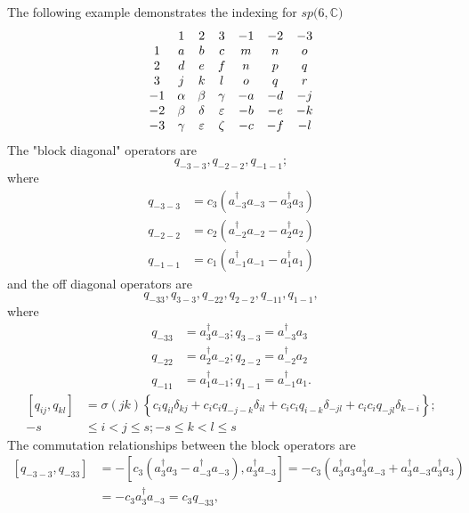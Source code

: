\documentclass[aps,preprint]{revtex4}%
\begin{document}
The following example demonstrates the indexing for $sp(6,\mathbb{C)}$%
\begin{equation}%
\begin{array}
[c]{ccccccc}
& 1 & 2 & 3 & -1 & -2 & -3\\
1 & a & b & c & m & n & o\\
2 & d & e & f & n & p & q\\
3 & j & k & l & o & q & r\\
-1 & \alpha & \beta & \gamma & -a & -d & -j\\
-2 & \beta & \delta & \varepsilon & -b & -e & -k\\
-3 & \gamma & \varepsilon & \zeta & -c & -f & -l
\end{array}
\end{equation}
The "block diagonal" operators are
\begin{equation}
q_{-3-3},q_{-2-2},q_{-1-1};
\end{equation}
where
\begin{align}
q_{-3-3}  &  =c_{3}\left(  a_{-3}^{\dagger}a_{-3}-a_{3}^{\dagger}a_{3}\right)
\nonumber\\
q_{-2-2}  &  =c_{2}\left(  a_{-2}^{\dagger}a_{-2}-a_{2}^{\dagger}a_{2}\right)
\nonumber\\
q_{-1-1}  &  =c_{1}\left(  a_{-1}^{\dagger}a_{-1}-a_{1}^{\dagger}a_{1}\right)
\end{align}
and the off diagonal operators are
\begin{equation}
q_{-33},q_{3-3},q_{-22},q_{2-2},q_{-11},q_{1-1},
\end{equation}
where%
\begin{align}
q_{-33}  &  =a_{3}^{\dagger}a_{-3};q_{3-3}=a_{-3}^{\dagger}a_{3}\nonumber\\
q_{-22}  &  =a_{2}^{\dagger}a_{-2};q_{2-2}=a_{-2}^{\dagger}a_{2}\nonumber\\
q_{-11}  &  =a_{1}^{\dagger}a_{-1};q_{1-1}=a_{-1}^{\dagger}a_{1}.
\end{align}%
\begin{align}
\left[  q_{ij},q_{kl}\right]   &  =\sigma\left(  jk\right)  \left\{
c_{i}q_{il}\delta_{kj}+c_{i}c_{i}q_{-j-k}\delta_{il}+c_{i}c_{i}q_{i-k}%
\delta_{-jl}+c_{i}c_{i}q_{-jl}\delta_{k-i}\right\}  ;\\
-s  &  \leq i<j\leq s;-s\leq k<l\leq s
\end{align}
The commutation relationships between the block operators are
\begin{align}
\left[  q_{-3-3},q_{-33}\right]   &  =-\left[  c_{3}\left(  a_{3}^{\dagger
}a_{3}-a_{-3}^{\dagger}a_{-3}\right)  ,a_{3}^{\dagger}a_{-3}\right]
=-c_{3}\left(  a_{3}^{\dagger}a_{3}a_{3}^{\dagger}a_{-3}+a_{3}^{\dagger}%
a_{-3}a_{3}^{\dagger}a_{3}\right) \nonumber\\
&  =-c_{3}a_{3}^{\dagger}a_{-3}=c_{3}q_{-33},
\end{align}%
\end{document}

